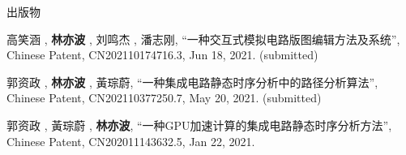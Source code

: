 \begin{rSection}{出版物}
\begin{description}[font=\normalfont, rightmargin=2em]
\item[{[P3]}]{
        高笑涵 ,  \textbf{林亦波} ,  刘鸣杰 ,  潘志刚, 
    ``一种交互式模拟电路版图编辑方法及系统'', 
    Chinese Patent, CN202110174716.3, Jun 18, 2021.
    (submitted)
}
            

\item[{[P2]}]{
        郭资政 ,  \textbf{林亦波} ,  黃琮蔚, 
    ``一种集成电路静态时序分析中的路径分析算法'', 
    Chinese Patent, CN202110377250.7, May 20, 2021.
    (submitted)
}
            

\item[{[P1]}]{
        郭资政 ,  黃琮蔚 ,  \textbf{林亦波}, 
    ``一种GPU加速计算的集成电路静态时序分析方法'', 
    Chinese Patent, CN202011143632.5, Jan 22, 2021.
    
}
            

\end{description}
    

\end{rSection}


